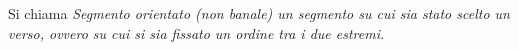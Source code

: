 \begin{definizione}
Si chiama \textit{Segmento orientato (non banale) un segmento su cui sia stato scelto un verso, ovvero su cui si sia fissato un ordine tra i due estremi.} 
\end{definizione}

